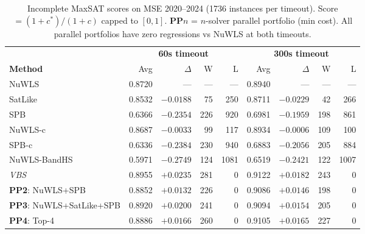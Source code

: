 \begin{table}[t]\centering\small
\caption{Incomplete MaxSAT scores on MSE 2020--2024 (1736 instances per timeout). Score $= (1+c^*)/(1+c)$ capped to $[0,1]$.
\textbf{PP}$n$ = $n$-solver parallel portfolio (min cost). All parallel portfolios have zero regressions vs NuWLS at both timeouts.}
\label{tab:main_combined}
\begin{tabular}{lrrrr|rrrr}\toprule
 & \multicolumn{4}{c|}{\textbf{60s timeout}} & \multicolumn{4}{c}{\textbf{300s timeout}} \\
\textbf{Method} & Avg & $\Delta$ & W & L & Avg & $\Delta$ & W & L \\\midrule
NuWLS & 0.8720 & --- & --- & --- & 0.8940 & --- & --- & --- \\
SatLike & 0.8532 & $-0.0188$ & 75 & 250 & 0.8711 & $-0.0229$ & 42 & 266 \\
SPB & 0.6366 & $-0.2354$ & 226 & 920 & 0.6981 & $-0.1959$ & 198 & 861 \\
NuWLS-c & 0.8687 & $-0.0033$ & 99 & 117 & 0.8934 & $-0.0006$ & 109 & 100 \\
SPB-c & 0.6336 & $-0.2384$ & 230 & 940 & 0.6883 & $-0.2056$ & 205 & 884 \\
NuWLS-BandHS & 0.5971 & $-0.2749$ & 124 & 1081 & 0.6519 & $-0.2421$ & 122 & 1007 \\
\textit{VBS} & 0.8955 & $+0.0235$ & 281 & 0 & 0.9122 & $+0.0182$ & 243 & 0 \\
\textbf{PP2}: NuWLS+SPB & 0.8852 & $+0.0132$ & 226 & 0 & 0.9086 & $+0.0146$ & 198 & 0 \\
\textbf{PP3}: NuWLS+SatLike+SPB & 0.8920 & $+0.0200$ & 241 & 0 & 0.9094 & $+0.0154$ & 205 & 0 \\
\textbf{PP4}: Top-4 & 0.8886 & $+0.0166$ & 260 & 0 & 0.9105 & $+0.0165$ & 227 & 0 \\
\bottomrule
\end{tabular}
\end{table}
